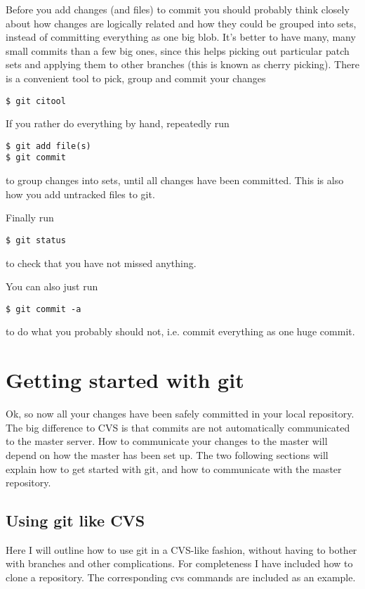 \documentclass[a4paper,10pt]{article}
\begin{document}
Before you add changes (and files) to
commit you should probably think closely about how changes are logically
related and how they could be grouped into sets, instead of committing
everything as one big blob. It's better to have many, many small commits than
a few big ones, since this helps picking out particular patch sets and
applying them to other branches (this is known as cherry picking).
There is a convenient tool to pick, group and commit 
your changes
\begin{verbatim}
$ git citool
\end{verbatim}
If you rather do everything by hand, repeatedly run
\begin{verbatim}
$ git add file(s) 
$ git commit
\end{verbatim}
to group changes into sets, until all changes have been committed. 
This is also how you add untracked files to git.

Finally run 
\begin{verbatim}
$ git status
\end{verbatim}
to check that you have not missed anything. 

You can also just run
\begin{verbatim}
$ git commit -a
\end{verbatim}
to do what you probably should not, i.e. commit everything as one huge commit.


\section{Getting started with git}
Ok, so now all your changes have been safely committed in your local
repository. The big difference to CVS is that commits are not automatically
communicated to the master server. How to communicate your changes to the
master will depend on how the master has been set up. The two following
sections will explain how to get started with git, and how to communicate with
the master repository.

\subsection{Using git like CVS}
Here I will outline how to use git in a CVS-like fashion, without having
to bother with branches and other complications. For completeness I have
included how to clone a repository.
The corresponding cvs commands are included as an example. 
\end{document}
